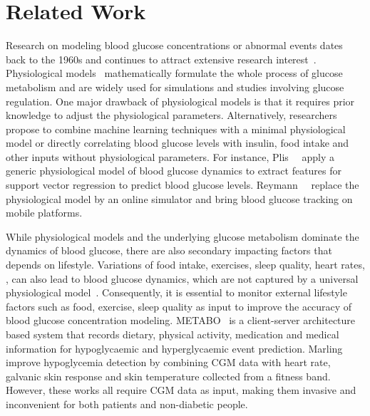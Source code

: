 \section{Related Work}
\label{sec:relwork}
Research on modeling blood glucose concentrations or abnormal events dates back to the 1960s and continues to attract extensive research interest~\cite{bib:IJNMBE16:Oviedo}.
Physiological models~\cite{bib:TBE07:Dalla, bib:PE04:Hovorka} mathematically formulate the whole process of glucose metabolism and are widely used for simulations and studies involving glucose regulation.
One major drawback of physiological models is that it requires prior knowledge to adjust the physiological parameters.
Alternatively, researchers propose to combine machine learning techniques with a minimal physiological model or directly correlating blood glucose levels with insulin, food intake and other inputs without physiological parameters.
For instance, Plis~\etal~\cite{bib:MAIHA14:Plis} apply a generic physiological model of blood glucose dynamics to extract features for support vector regression to predict blood glucose levels.
Reymann~\etal~\cite{bib:EMBC16:Reymann} replace the physiological model by an online simulator and bring blood glucose tracking on mobile platforms.

While physiological models and the underlying glucose metabolism dominate the dynamics of blood glucose, there are also secondary impacting factors that depends on lifestyle.
Variations of food intake, exercises, sleep quality, heart rates, \etc, can also lead to blood glucose dynamics, which are not captured by a universal physiological model~\cite{bib:DRCP15:Iwasaki}.
Consequently, it is essential to monitor external lifestyle factors such as food, exercise, sleep quality as input to improve the accuracy of blood glucose concentration modeling.
METABO~\cite{bib:EMBC09:Georga} is a client-server architecture based system that records dietary, physical activity, medication and medical information for hypoglycaemic and hyperglycaemic event prediction.
Marling~\etal~\cite{bib:KDHealth16:Marling} improve hypoglycemia detection by combining CGM data with heart rate, galvanic skin response and skin temperature collected from a fitness band.
However, these works all require CGM data as input, making them invasive and inconvenient for both patients and non-diabetic people.


